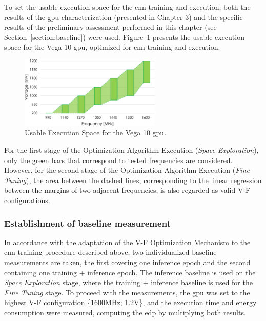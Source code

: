 To set the usable execution space for the \acrshort{cnn} training and execution, both the results of the \acrshort{gpu} characterization (presented in Chapter 3) and the specific results of the preliminary assessment performed in this chapter (see Section~\ref{section:baseline}) were used. Figure~\ref{fig:ues} presents the usable execution space for the Vega 10 \acrshort{gpu}, optimized for  \acrshort{cnn} training and execution.

\begin{figure}[htb]
    \centering
        \includegraphics[width=0.6\textwidth]{Figures/Application To Deep Learning/UES.pdf}
        \caption{Usable Execution Space for the Vega 10 \acrshort{gpu}.}
    \label{fig:ues}
\end{figure}



For the first stage of the Optimization Algorithm Execution (\textit{Space Exploration}), only the green bars that correspond to tested frequencies are considered. However, for the second stage of the Optimization Algorithm Execution (\textit{Fine-Tuning}), the area between the dashed lines, corresponding to the linear regression between the margins of two adjacent frequencies, is also regarded as valid V-F configurations.

\subsubsection{Establishment of baseline measurement}

In accordance with the adaptation of the V-F Optimization Mechanism to the \acrshort{cnn} training procedure described above, two individualized baseline measurements are taken, the first covering one inference epoch and the second containing one training + inference epoch. The inference baseline is used on the \textit{Space Exploration} stage, where the training + inference baseline is used for the  \textit{Fine Tuning} stage. To proceed with the measurements, the \acrshort{gpu} was set to the highest V-F configuration \{1600MHz; 1.2V\}, and the execution time and energy consumption were measured, computing the \acrshort{edp} by multiplying both results.





